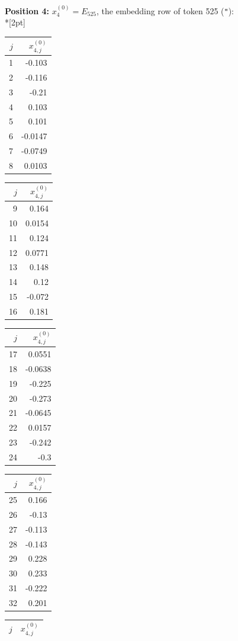 \noindent \textbf{Position 4:} $x^{(0)}_{4} = E_{525}$, the embedding row of token 525 (\texttt{"}):\\*[2pt]
{\tablefont \begin{tabular}[t]{r|r}
$j$ & $x^{(0)}_{4,j}$ \\\hline
1 & -0.103 \\
2 & -0.116 \\
3 & -0.21 \\
4 & 0.103 \\
5 & 0.101 \\
6 & -0.0147 \\
7 & -0.0749 \\
8 & 0.0103
\end{tabular}\kern4pt
\begin{tabular}[t]{r|r}
$j$ & $x^{(0)}_{4,j}$ \\\hline
9 & 0.164 \\
10 & 0.0154 \\
11 & 0.124 \\
12 & 0.0771 \\
13 & 0.148 \\
14 & 0.12 \\
15 & -0.072 \\
16 & 0.181
\end{tabular}\kern4pt
\begin{tabular}[t]{r|r}
$j$ & $x^{(0)}_{4,j}$ \\\hline
17 & 0.0551 \\
18 & -0.0638 \\
19 & -0.225 \\
20 & -0.273 \\
21 & -0.0645 \\
22 & 0.0157 \\
23 & -0.242 \\
24 & -0.3
\end{tabular}\kern4pt
\begin{tabular}[t]{r|r}
$j$ & $x^{(0)}_{4,j}$ \\\hline
25 & 0.166 \\
26 & -0.13 \\
27 & -0.113 \\
28 & -0.143 \\
29 & 0.228 \\
30 & 0.233 \\
31 & -0.222 \\
32 & 0.201
\end{tabular}\kern4pt
\begin{tabular}[t]{r|r}
$j$ & $x^{(0)}_{4,j}$ \\\hline

\end{tabular}}
